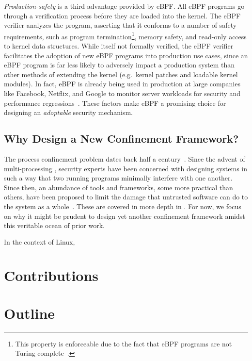 \textit{Production-safety} is a third advantage provided by eBPF. All eBPF programs go
through a verification process before they are loaded into the kernel. The eBPF verifier
analyzes the program, asserting that it conforms to a number of safety requirements, such
as program termination\footnote{This property is enforceable due to the fact that eBPF
programs are not Turing complete~\cite{gregg2019_bpf}.}, memory safety, and read-only
access to kernel data structures. While itself not formally verified, the eBPF verifier
facilitates the adoption of new eBPF programs into production use cases, since an eBPF
program is far less likely to adversely impact a production system than other methods of
extending the kernel (e.g.~kernel patches and loadable kernel modules). In fact, eBPF is
already being used in production at large companies like Facebook, Netflix, and Google to
monitor server workloads for security and performance regressions~\cite{gregg2019_bpf}.
These factors make eBPF a promising choice for designing an \textit{adoptable} security
mechanism.


\subsection{Why Design a New Confinement Framework?}%
\label{ss:why-new}

The process confinement problem dates back half a century~\cite{lampson1973_confinement}.
Since the advent of multi-processing ,
security experts have been concerned with designing systems in such a way that two running
programs minimally interfere with one another. Since then, an abundance of tools and
frameworks, some more practical than others, have been proposed to limit the damage that
untrusted software can do to the system as a whole~\cite{shu2016_security_isolation_study}.
These are covered in more depth in . For now, we focus on why it might be
prudent to design yet another confinement framework amidst this veritable ocean of prior work.

In the context of Linux,



\section{Contributions}%
\label{s:contributions}


\section{Outline}%
\label{s:outline}
